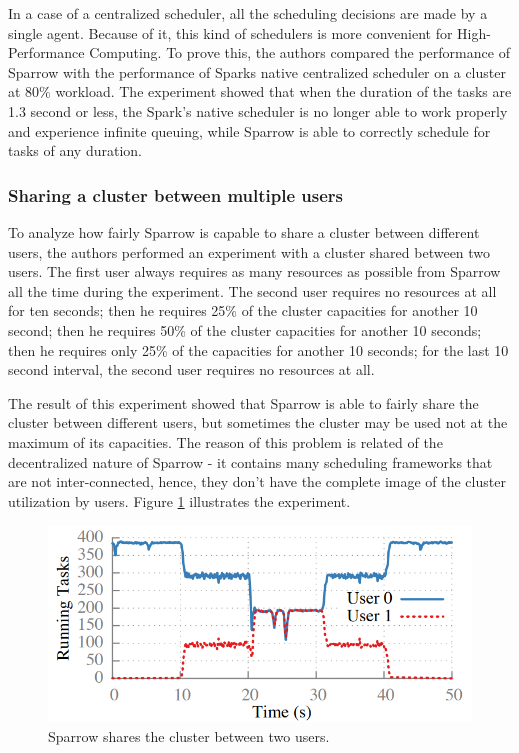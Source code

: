 \documentclass[11pt]{article}
\begin{document}
        	In a case of a centralized scheduler, all the scheduling decisions are made by a single agent. Because of it, this kind of schedulers is more convenient for High-Performance Computing. To prove this, the authors compared the performance of Sparrow with the performance of Sparks native centralized scheduler on a cluster at 80\% workload. The experiment showed that when the duration of the tasks are 1.3 second or less, the Spark's native scheduler is no longer able to work properly and experience infinite queuing, while Sparrow is able to correctly schedule for tasks of any duration.
        
        
        \subsubsection*{Sharing a cluster between multiple users}
        
        	To analyze how fairly Sparrow is capable to share a cluster between different users, the authors performed an experiment with a cluster shared between two users. The first user always requires as many resources as possible from Sparrow all the time during the experiment. The second user requires no resources at all for ten seconds; then he requires 25\% of the cluster capacities for another 10 second; then he requires 50\% of the cluster capacities for another 10 seconds; then he requires only 25\% of the capacities for another 10 seconds; for the last 10 second interval, the second user requires no resources at all.
            
            The result of this experiment showed that Sparrow is able to fairly share the cluster between different users, but sometimes the cluster may be used not at the maximum of its capacities. The reason of this problem is related of the decentralized nature of Sparrow - it contains many scheduling frameworks that are not inter-connected, hence, they don't have the complete image of the cluster utilization by users. Figure \ref{fig5} illustrates the experiment.
            
            \begin{figure}
            		\centering
            		\includegraphics[scale=.35]{fig5}
            		\caption{Sparrow shares the cluster between two users.}
            		\label{fig5}
            \end{figure}
        
\end{document}
